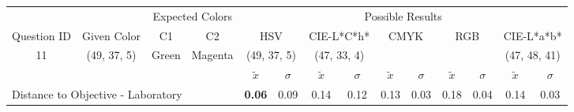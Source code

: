 \begin{table}[H]
  \resizebox{\textwidth}{!} {
  \begin{tabular}{lccccccccccccc}
    \hline
    \multicolumn{1}{c}{}                              &                                      & \multicolumn{2}{c}{Expected Colors}                   & \multicolumn{10}{c}{Possible Results}                                                                                                                                                                                                                                                                                        \\ \cline{3-14}
    \multicolumn{1}{c}{\multirow{-2}{*}{Question ID}} & \multirow{-2}{*}{Given Color}        & C1                       & C2                         & \multicolumn{2}{c}{HSV}                                        & \multicolumn{2}{c}{CIE-L*C*h*}                                 & \multicolumn{2}{c}{CMYK}                                       & \multicolumn{2}{c}{RGB}                                        & \multicolumn{2}{c}{CIE-L*a*b*}                                 \\ \hline
    \multicolumn{1}{c}{11}                             & \cellcolor[HTML]{FF8000}(49, 37, 5) & \multicolumn{1}{c|}{Green} & \multicolumn{1}{c|}{Magenta}  & \multicolumn{2}{c|}{\cellcolor[HTML]{FF8000}(49, 37, 5)}      & \multicolumn{2}{c|}{\cellcolor[HTML]{FF6F00}(47, 33, 4)}       & \multicolumn{2}{c|}{\cellcolor[HTML]{808080}{\color[HTML]{FFFFFF}(21, 22, 24)}}       & \multicolumn{2}{c|}{\cellcolor[HTML]{808080}{\color[HTML]{FFFFFF}(21, 22, 24)}}       & \multicolumn{2}{c|}{\cellcolor[HTML]{C9B2A2}(47, 48, 41)}       \\ \hline
                                                      & \multicolumn{1}{l}{}                 & \multicolumn{1}{l}{}     & \multicolumn{1}{l}{}       & \multicolumn{1}{c}{$\tilde{x}$} & \multicolumn{1}{c}{$\sigma$} & \multicolumn{1}{c}{$\tilde{x}$} & \multicolumn{1}{c}{$\sigma$} & \multicolumn{1}{c}{$\tilde{x}$} & \multicolumn{1}{c}{$\sigma$} & \multicolumn{1}{c}{$\tilde{x}$} & \multicolumn{1}{c}{$\sigma$} & \multicolumn{1}{c}{$\tilde{x}$} & \multicolumn{1}{c}{$\sigma$} \\ \hline
    \multicolumn{4}{l}{Distance to Objective - Laboratory}                                                                                           & \multicolumn{1}{|c}{\textbf{0.06}}       & \multicolumn{1}{c|}{0.09}    & \multicolumn{1}{|c}{0.14}       & \multicolumn{1}{c|}{0.12}    & \multicolumn{1}{|c}{0.13}       & \multicolumn{1}{c|}{0.03}    & \multicolumn{1}{|c}{0.18}       & \multicolumn{1}{c|}{0.04}    & \multicolumn{1}{|c}{0.14}       & \multicolumn{1}{c|}{0.03}    \\

\end{tabular}}
\end{table}
